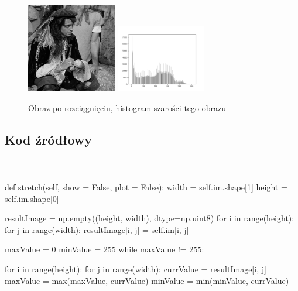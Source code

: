 \documentclass[final,a4paper,openany,12pt]{mwbk}
\begin{document}
\begin{figure}[H]
	\begin{center}
		\includegraphics[width=0.35\textwidth]{pirate_gray_stretchHist_result}
		\includegraphics[width=0.35\textwidth]{pirate_gray_stretchHist_histogram}
	\end{center}
	\caption{Obraz po rozciągnięciu, histogram szarości tego obrazu}
\end{figure}

\subsection*{Kod źródłowy}
\hfill
\\\\
\noindent def stretch(self, show = False, plot = False):
\indent width = self.im.shape[1] \newline
\indent height = self.im.shape[0] \newline

resultImage = np.empty((height, width), dtype=np.uint8) \newline
\indent for i in range(height): \newline
\indent for j in range(width): \newline
\indent resultImage[i, j] = self.im[i, j] \newline

maxValue = 0 \newline
\indent minValue = 255 \newline
\indent while maxValue != 255: \newline

for i in range(height): \newline
\indent for j in range(width): \newline
\indent \indent \indent currValue = resultImage[i, j] \newline
\indent \indent \indent maxValue = max(maxValue, currValue) \newline
\indent \indent \indent minValue = min(minValue, currValue) \newline
\end{document}
